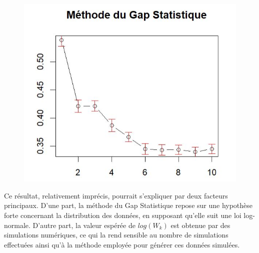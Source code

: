 \begin{figure}[H]
    \centering
    \includegraphics[width=0.6\linewidth]{images/Gap3.JPG}
    \caption{}
    \label{fig:gap3}
\end{figure}

Ce résultat, relativement imprécis, pourrait s'expliquer par deux facteurs principaux. D'une part, la méthode du Gap Statistique repose sur une hypothèse forte concernant la distribution des données, en supposant qu'elle suit une loi log-normale. D'autre part, la valeur espérée de \(log(W_k)\) est obtenue par des simulations numériques, ce qui la rend sensible au nombre de simulations effectuées ainsi qu'à la méthode employée pour générer ces données simulées.
